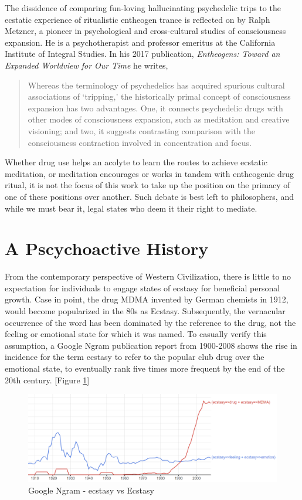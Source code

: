 \documentclass{UIdahoMastersThesis}
\begin{document}
The dissidence of comparing fun-loving hallucinating psychedelic trips to the ecstatic experience of ritualistic entheogen trance is reflected on by Ralph Metzner, a pioneer in psychological and cross-cultural studies of consciousness expansion. He is a psychotherapist and professor emeritus at the California Institute of Integral Studies. In his 2017 publication, \emph{Entheogens: Toward an Expanded Worldview for Our Time} he writes,

\begin{quote}
{Whereas the terminology of psychedelics has acquired spurious cultural associations of `tripping,' the historically primal concept of consciousness expansion has two advantages. One, it connects psychedelic drugs with other modes of consciousness expansion, such as meditation and creative visioning; and two, it suggests contrasting comparison with the consciousness contraction involved in concentration and focus.}\cite{metzner_entheogenesis:_2017}
\end{quote}

Whether drug use helps an acolyte to learn the routes to achieve ecstatic meditation, or meditation encourages or works in tandem with entheogenic drug ritual, it is not the focus of this work to take up the position on the primacy of one of these positions over another. Such debate is best left to philosophers, and while we must bear it, legal states who deem it their right to mediate.

\section{A Pscychoactive History}

From the contemporary perspective of Western Civilization, there is little to no expectation for individuals to engage states of ecstasy for beneficial personal growth. Case in point, the drug MDMA invented by German chemists in 1912, would become popularized in the 80s as Ecstasy. Subsequently, the vernacular occurrence of the word has been dominated by the reference to the drug, not the feeling or emotional state for which it was named. To casually verify this assumption, a Google Ngram publication report from 1900-2008 shows the rise in incidence for the term ecstasy to refer to the popular club drug over the emotional state, to eventually rank five times more frequent by the end of the 20th century. [Figure \ref{fig:ngram}]

\begin{figure}[h!]
	\centering
	\includegraphics[width=\linewidth]{ecstasy_ngram.png}
	\caption{Google Ngram - ecstasy vs Ecstasy}
	\label{fig:ngram}
\end{figure}
\end{document}
